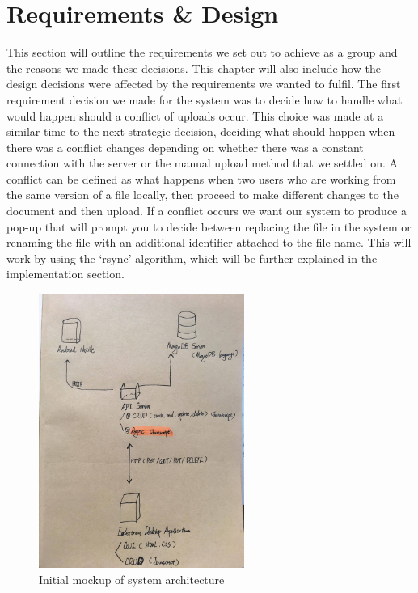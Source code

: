 \documentclass[11pt]{article}
\begin{document}
\section{Requirements \& Design}

This section will outline the requirements we set out to achieve as a group and the reasons we made these decisions. This chapter will also include how the design decisions were affected by the requirements we wanted to fulfil. 
The first requirement decision we made for the system was to decide how to handle what would happen should a conflict of uploads occur. This choice was made at a similar time to the next strategic decision, deciding what should happen when there was a conflict changes depending on whether there was a constant connection with the server or the manual upload method that we settled on. A conflict can be defined as what happens when two users who are working from the same version of a file locally, then proceed to make different changes to the document and then upload. If a conflict occurs we want our system to produce a pop-up that will prompt you to decide between replacing the file in the system or renaming the file with an additional identifier attached to the file name. This will work by using the ‘rsync’ algorithm, which will be further explained in the implementation section.


\begin{figure} [h!]
\caption{Initial mockup of system architecture}
\centering
\includegraphics[width=0.6\textwidth]{Group_Project/drawing.jpg}
\end{figure}
\end{document}
